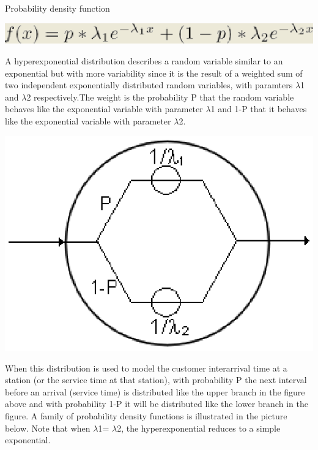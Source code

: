 Probability density function\\
\begin{center}
\includegraphics[scale=.5]{img/jsim/huperexpon1.eps}
\end{center}
A hyperexponential distribution describes a random  variable similar to an exponential but with more variability since it is the result of a weighted sum of two independent exponentially distributed  random variables, with paramters $\lambda$1 and $\lambda$2 respectively.The weight is the probability P that the random variable behaves like the exponential variable with parameter $\lambda$1 and 1-P that it behaves like the exponential variable with parameter $\lambda$2.\\
\begin{center}
\includegraphics[scale=.5]{img/jsim/hyperExp1.eps}
\end{center}
When this distribution is used to model the customer interarrival time at a station (or the service time at that station), with  probability P the next interval before an arrival (service time) is  distributed like the upper branch in the figure above and with probability 1-P it will be distributed like the lower branch in the figure.
A family of probability density functions is illustrated in the picture below. Note that when $\lambda$1= $\lambda$2, the hyperexponential reduces to a simple exponential.\\

